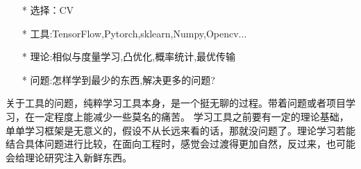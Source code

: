 \indent
\begin{enumerate}
    \item[*] 选择：CV
    \item[*] 工具:TensorFlow,Pytorch,sklearn,Numpy,Opencv...
    \item[*] 理论:相似与度量学习,凸优化,概率统计,最优传输
    \item[*] 问题:怎样学到最少的东西,解决更多的问题?
\end{enumerate}

关于工具的问题，纯粹学习工具本身，是一个挺无聊的过程。带着问题或者项目学习，在一定程度上能减少一些莫名的痛苦。
学习工具之前要有一定的理论基础，单单学习框架是无意义的，假设不从长远来看的话，那就没问题了。理论学习若能结合具体问题进行比较，在面向工程时，感觉会过渡得更加自然，反过来，也可能会给理论研究注入新鲜东西。


\endinput